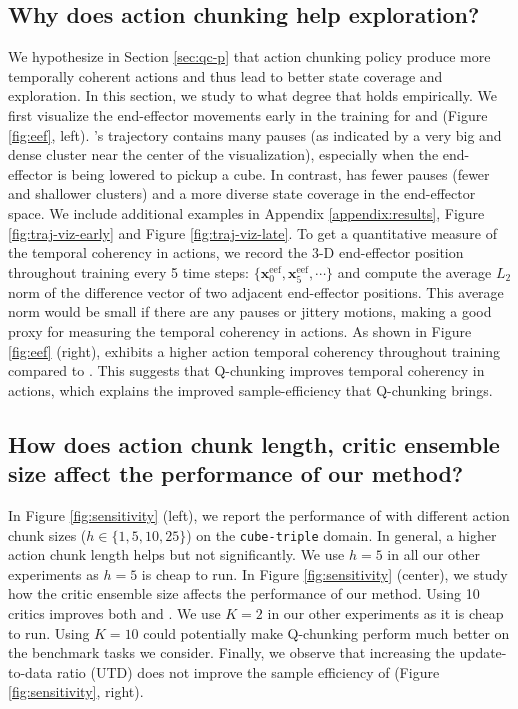 \subsection{Why does action chunking help exploration?}
We hypothesize in Section \ref{sec:qc-p} that action chunking policy produce more temporally coherent actions and thus lead to better state coverage and exploration. In this section, we study to what degree that holds empirically. We first visualize the end-effector movements early in the training for  and  (Figure \ref{fig:eef}, left). 's trajectory contains many pauses (as indicated by a very big and dense cluster near the center of the visualization), especially when the end-effector is being lowered to pickup a cube. In contrast,  has fewer pauses (fewer and shallower clusters) and a more diverse state coverage in the end-effector space. We include additional examples in Appendix \ref{appendix:results}, Figure \ref{fig:traj-viz-early} and Figure \ref{fig:traj-viz-late}. To get a quantitative measure of the temporal coherency in actions, we record the 3-D end-effector position throughout training every 5 time steps: $\{\mathbf{x}^{\mathrm{eef}}_0, \mathbf{x}^{\mathrm{eef}}_5, \cdots\}$ and compute the average $L_2$ norm of the difference vector of two adjacent end-effector positions. This average norm would be small if there are any pauses or jittery motions, making a good proxy for measuring the temporal coherency in actions.
As shown in Figure \ref{fig:eef} (right),  exhibits a higher action temporal coherency throughout training compared to . This suggests that Q-chunking improves temporal coherency in actions, which explains the improved sample-efficiency that Q-chunking brings.

\subsection{How does action chunk length, critic ensemble size affect the performance of our method?}
In Figure \ref{fig:sensitivity} (left), we report the performance of  with different action chunk sizes ($h \in \{1, 5, 10, 25\}$) on the \texttt{cube-triple} domain. In general, a higher action chunk length helps but not significantly. We use $h=5$ in all our other experiments as $h=5$ is cheap to run. In Figure \ref{fig:sensitivity} (center), we study how the critic ensemble size affects the performance of our method. Using 10 critics improves both  and . We use $K=2$ in our other experiments as it is cheap to run. Using $K=10$ could potentially make Q-chunking perform much better on the benchmark tasks we consider. Finally, we observe that increasing the update-to-data ratio (UTD) does not improve the sample efficiency of  (Figure \ref{fig:sensitivity}, right).


